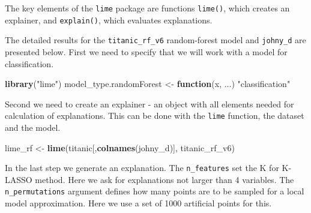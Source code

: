 \documentclass[]{krantz}
\newenvironment{Shaded}{\begin{snugshade}}{\end{snugshade}}
\newcommand{\ControlFlowTok}[1]{\textcolor[rgb]{0.13,0.29,0.53}{\textbf{#1}}}
\newcommand{\KeywordTok}[1]{\textcolor[rgb]{0.13,0.29,0.53}{\textbf{#1}}}
\newcommand{\NormalTok}[1]{#1}
\newcommand{\StringTok}[1]{\textcolor[rgb]{0.31,0.60,0.02}{#1}}
\begin{document}
The key elements of the \texttt{lime} package are functions \texttt{lime()}, which creates an explainer, and \texttt{explain()}, which evaluates explanations.

The detailed results for the \texttt{titanic\_rf\_v6} random-forest model and \texttt{johny\_d} are presented below. First we need to specify that we will work with a model for classification.

\begin{Shaded}
\begin{Highlighting}[]
\KeywordTok{library}\NormalTok{(}\StringTok{"lime"}\NormalTok{)}
\NormalTok{model_type.randomForest <-}\StringTok{ }\ControlFlowTok{function}\NormalTok{(x, ...) }\StringTok{"classification"}
\end{Highlighting}
\end{Shaded}

Second we need to create an explainer - an object with all elements needed for calculation of explanations. This can be done with the \texttt{lime} function, the dataset and the model.

\begin{Shaded}
\begin{Highlighting}[]
\NormalTok{lime_rf <-}\StringTok{ }\KeywordTok{lime}\NormalTok{(titanic[,}\KeywordTok{colnames}\NormalTok{(johny_d)], titanic_rf_v6)}
\end{Highlighting}
\end{Shaded}

In the last step we generate an explanation. The \texttt{n\_features} set the K for K-LASSO method. Here we ask for explanations not larger than 4 variables. The \texttt{n\_permutations} argument defines how many points are to be sampled for a local model approximation. Here we use a set of 1000 artificial points for this.
\end{document}
